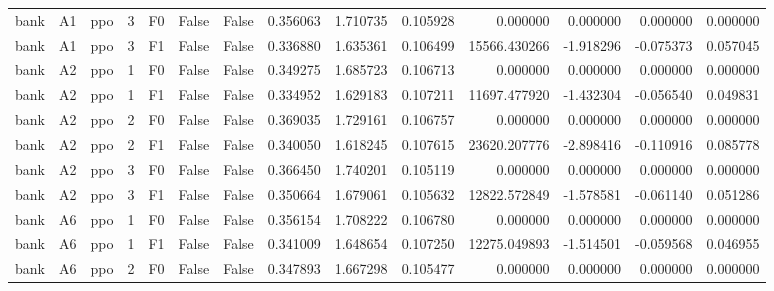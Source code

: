 \begin{tabular}{lllrlllrrrrrrr}
      bank &      A1 &       ppo &     3 &  F0 &           False &            False &  0.356063 &  1.710735 & 0.105928 &         0.000000 &           0.000000 &        0.000000 &            0.000000 \\
      bank &      A1 &       ppo &     3 &  F1 &           False &            False &  0.336880 &  1.635361 & 0.106499 &     15566.430266 &          -1.918296 &       -0.075373 &            0.057045 \\
      bank &      A2 &       ppo &     1 &  F0 &           False &            False &  0.349275 &  1.685723 & 0.106713 &         0.000000 &           0.000000 &        0.000000 &            0.000000 \\
      bank &      A2 &       ppo &     1 &  F1 &           False &            False &  0.334952 &  1.629183 & 0.107211 &     11697.477920 &          -1.432304 &       -0.056540 &            0.049831 \\
      bank &      A2 &       ppo &     2 &  F0 &           False &            False &  0.369035 &  1.729161 & 0.106757 &         0.000000 &           0.000000 &        0.000000 &            0.000000 \\
      bank &      A2 &       ppo &     2 &  F1 &           False &            False &  0.340050 &  1.618245 & 0.107615 &     23620.207776 &          -2.898416 &       -0.110916 &            0.085778 \\
      bank &      A2 &       ppo &     3 &  F0 &           False &            False &  0.366450 &  1.740201 & 0.105119 &         0.000000 &           0.000000 &        0.000000 &            0.000000 \\
      bank &      A2 &       ppo &     3 &  F1 &           False &            False &  0.350664 &  1.679061 & 0.105632 &     12822.572849 &          -1.578581 &       -0.061140 &            0.051286 \\
      bank &      A6 &       ppo &     1 &  F0 &           False &            False &  0.356154 &  1.708222 & 0.106780 &         0.000000 &           0.000000 &        0.000000 &            0.000000 \\
      bank &      A6 &       ppo &     1 &  F1 &           False &            False &  0.341009 &  1.648654 & 0.107250 &     12275.049893 &          -1.514501 &       -0.059568 &            0.046955 \\
      bank &      A6 &       ppo &     2 &  F0 &           False &            False &  0.347893 &  1.667298 & 0.105477 &         0.000000 &           0.000000 &        0.000000 &            0.000000 \\

\end{tabular}
